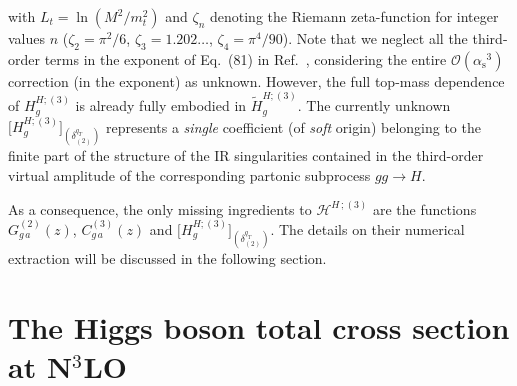 \documentclass[12pt]{article}
\DeclareRobustCommand{\alphas}{\ensuremath{\alpha_{\mathrm{s}}}\xspace}
\DeclareRobustCommand{\as}{\alphas}
\DeclareRobustCommand{\qt}{\ensuremath{q_T}\xspace}
\DeclareRobustCommand{\cH}{\ensuremath{\mathcal{H}}}
\begin{document}
with $L_t=\ln(M^2/m_t^2)$ and $\zeta_n$ denoting the Riemann zeta-function for integer values $n$ ($\zeta_2=\pi^2/6$, $\zeta_3=1.202\dots$, $\zeta_4=\pi^4/90$).
Note that we neglect all the third-order terms in the exponent of Eq.~(81) in Ref.~\cite{Catani:2013tia}, considering the entire $\mathcal{O}(\as^{3})$ correction (in the exponent) as unknown. However, the full top-mass dependence of $H^{H;(3)}_g$ is already fully embodied in $\widetilde{H}^{H;(3)}_{g}$.
The currently unknown $\big[H^{H;(3)}_{g}\big]_{(\delta^{\qt}_{(2)})}$ represents a \emph{single} coefficient (of \emph{soft} origin) belonging to the finite part of the structure of the IR singularities contained in the third-order virtual amplitude of the corresponding partonic subprocess $gg \to H$. 

As a consequence, the only missing ingredients to $\cH^{H \,;(3)}$ are the functions $G^{(2)}_{g\,a}(z)$, $C^{(3)}_{g\,a}(z)$ and $ \big[H^{H;(3)}_{g}\big]_{(\delta^{\qt}_{(2)})}$. 
The details on their numerical extraction will be discussed in the following section.




\section{The Higgs boson total cross section at \texorpdfstring{N${}^\text{3}$LO}{N3LO}}
\label{sec:numforCN3}
\end{document}
